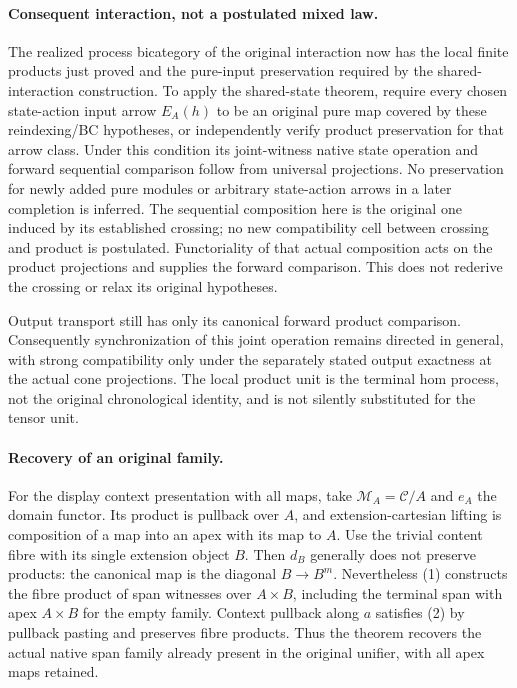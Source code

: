 \documentclass{article}
\begin{document}
\paragraph{Consequent interaction, not a postulated mixed law.} The realized process bicategory of the original interaction now has the local finite products just proved and the pure-input preservation required by the shared-interaction construction. To apply the shared-state theorem, require every chosen state-action input arrow $E_A(h)$ to be an original pure map covered by these reindexing/BC hypotheses, or independently verify product preservation for that arrow class. Under this condition its joint-witness native state operation and forward sequential comparison follow from universal projections. No preservation for newly added pure modules or arbitrary state-action arrows in a later completion is inferred. The sequential composition here is the original one induced by its established crossing; no new compatibility cell between crossing and product is postulated. Functoriality of that actual composition acts on the product projections and supplies the forward comparison. This does not rederive the crossing or relax its original hypotheses.

Output transport still has only its canonical forward product comparison. Consequently synchronization of this joint operation remains directed in general, with strong compatibility only under the separately stated output exactness at the actual cone projections. The local product unit is the terminal hom process, not the original chronological identity, and is not silently substituted for the tensor unit.

\paragraph{Recovery of an original family.} For the display context presentation with all maps, take $\mathcal M_A=\mathcal C/A$ and $e_A$ the domain functor. Its product is pullback over $A$, and extension-cartesian lifting is composition of a map into an apex with its map to $A$. Use the trivial content fibre with its single extension object $B$. Then $d_B$ generally does not preserve products: the canonical map is the diagonal $B\to B^m$. Nevertheless (1) constructs the fibre product of span witnesses over $A\times B$, including the terminal span with apex $A\times B$ for the empty family. Context pullback along $a$ satisfies (2) by pullback pasting and preserves fibre products. Thus the theorem recovers the actual native span family already present in the original unifier, with all apex maps retained.
\end{document}
